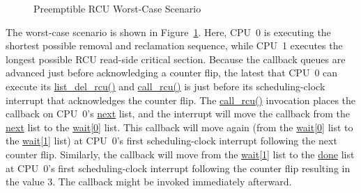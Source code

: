 \begin{figure}[htb]
\begin{center}
\end{center}
\caption{Preemptible RCU Worst-Case Scenario}
\label{app:rcuimpl:Preemptible RCU Worst-Case Scenario}
\end{figure}

The worst-case scenario is shown in
Figure~\ref{app:rcuimpl:Preemptible RCU Worst-Case Scenario}.
Here, CPU~0 is executing the shortest possible
removal and reclamation sequence,
while CPU~1 executes the longest possible RCU read-side critical
section.
Because the callback queues are advanced just before acknowledging a
counter flip, the latest that CPU~0 can execute its
\url{list_del_rcu()} and \url{call_rcu()} is just before
its scheduling-clock interrupt that acknowledges the counter flip.
The \url{call_rcu()} invocation places the callback on CPU~0's
\url{next} list, and the interrupt will move the callback from
the \url{next} list to the \url{wait[0]} list.
This callback will move again (from the \url{wait[0]} list
to the \url{wait[1]} list) at CPU~0's first scheduling-clock
interrupt following the next counter flip.
Similarly, the callback will move from the \url{wait[1]} list
to the \url{done} list at CPU~0's first scheduling-clock
interrupt following the counter flip resulting in the value 3.
The callback might be invoked immediately afterward.

